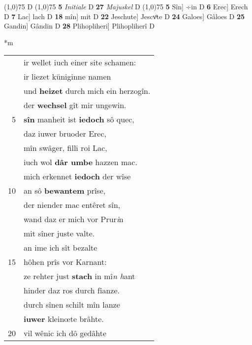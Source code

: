 \documentclass[8pt,a4paper,notitlepage]{article}
\begin{document}
\begin{table}[ht]
\begin{minipage}[t]{0.5\linewidth}
\begin{tabular}{rl}
\end{tabular}
\scriptsize
\line(1,0){75} \newline
D \newline
\line(1,0){75} \newline
\textbf{5} \textit{Initiale} D  \textbf{27} \textit{Majuskel} D  \newline
\line(1,0){75} \newline
\textbf{5} Sîn] ÷in D \textbf{6} Erec] Erech D \textbf{7} Lac] lach D \textbf{18} mîn] mit D \textbf{22} Jeschute] Jescvͦte D \textbf{24} Galoes] Gâloes D \textbf{25} Gandin] Gândin D \textbf{28} Plihopliheri] Plihopliherî D \newline
\end{minipage}
\hspace{0.5cm}
\begin{minipage}[t]{0.5\linewidth}
\small
\begin{center}*m
\end{center}
\begin{tabular}{rl}
 & ir wellet iuch einer site schamen:\\ 
 & ir liezet küniginne namen\\ 
 & und \textbf{heizet} durch mich ein herzogîn.\\ 
 & der \textbf{wechsel} gît mir ungewin.\\ 
5 & \textbf{sîn} manheit ist \textbf{iedoch} sô quec,\\ 
 & daz iuwer bruoder Erec,\\ 
 & mîn swâger, filli roi Lac,\\ 
 & iuch wol \textbf{dâr umbe} hazzen mac.\\ 
 & mich erkennet \textbf{iedoch} der wîse\\ 
10 & an sô \textbf{bewantem} prîse,\\ 
 & der niender mac entêret sîn,\\ 
 & wand daz er mich vor Prur\textit{i}n\\ 
 & mit sîner juste valte.\\ 
 & an ime ich sît bezalte\\ 
15 & hôhen prîs vor Karnant:\\ 
 & ze rehter just \textbf{stach} in mî\textit{n h}ant\\ 
 & hinder daz ros durch fîanze.\\ 
 & durch sînen schilt mîn lanze\\ 
 & \textbf{iuwer} kleinœte brâhte.\\ 
20 & vil wênic ich dô gedâhte\\ 

\end{tabular}
\end{minipage}
\end{table}
\end{document}
